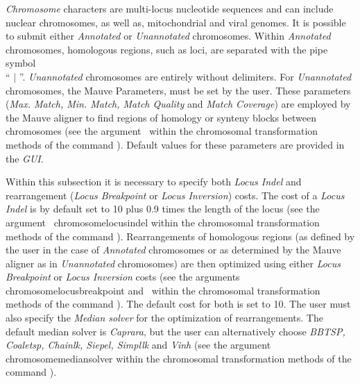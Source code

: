 \begin{description}
\setlength{\labelsep}{5pt}
\setlength{\itemindent}{0pt}%
\setlength{\parindent}{0.5cm}
	\item [Chromosome Parameters] \emph{Chromosome} characters are multi-locus 
		nucleotide sequences and can include nuclear chromosomes, as well as, mitochondrial 
		and viral genomes. It is possible to submit either \emph{Annotated} or \emph{Unannotated} 
		chromosomes. Within \emph{Annotated} chromosomes,  homologous regions, such as loci,
		are separated with the pipe symbol\\ `` $\vert$ ''.  \emph{Unannotated} chromosomes are entirely 
		without delimiters. For \emph{Unannotated} chromosomes, the Mauve Parameters, must be set
		by the user.  These parameters (\emph{Max. Match, Min. Match, Match Quality} and \emph {Match 
		Coverage})
		 are employed by the Mauve aligner to find regions of homology or synteny blocks 
		 between chromosomes (see the argument~ 
		 within the chromosomal transformation methods of the command ). 
		 Default values for these parameters are provided in the \emph{GUI}.
		            	
		\indent Within this subsection it is necessary to specify both \emph{Locus Indel} and rearrangement 
		(\emph{Locus Breakpoint} or \emph{Locus Inversion}) costs.  The cost of a \emph{Locus Indel} 
		is by default set to 10 plus 0.9 times the length of the locus (see the argument~
		{chromosomelocusindel}  within the chromosomal transformation methods of the command 
		). Rearrangements of homologous regions (as defined by the user in 
		the case of \emph{Annotated} chromosomes or as determined by the Mauve aligner as in 
		\emph{Unannotated} chromosomes) are then optimized using either \emph{Locus Breakpoint} 
		or \emph{Locus Inversion} costs (see the arguments~
		{chromosomelocusbreakpoint} and~
		 within the chromosomal transformation methods of the command ). 
		 The default cost for both is set to 10. The user must also specify the 
		\emph{Median solver} for the optimization of rearrangements. The default median solver is 
		\emph{Caprara}, but the user can alternatively choose \emph{BBTSP, Coaletsp, 
		Chainlk, Siepel, Simpllk} and \emph{Vinh} (see the argument~
		{chromosomemediansolver} within the chromosomal transformation methods of the command 
		).
		

\end{description}
